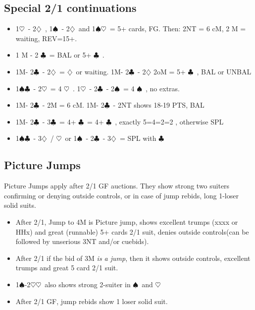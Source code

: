\documentclass{article}
\newcommand\C{\ensuremath{\clubsuit}}
\newcommand\D{\ensuremath{\diamondsuit}}
\renewcommand\H{\ensuremath{\heartsuit}}
\renewcommand\S{\ensuremath{\spadesuit}}
\begin{document}
\begin{multicols}{2}
  \subsection{Special 2/1 continuations}
  \label{2over1}
  \begin{itemize}
    \item 1\H\ - 2\D\ ,  1\S\ - 2\D\ and 1\S{}\H\ = 5+ cards, FG. Then: 2NT = 6 cM, 2 M = waiting, REV=15+.
    \item 1 M - 2 \C\ = BAL or 5+ \C\ .
    \item 1M- 2\C\ - 2\D\ = \D\ or waiting. 1M- 2\C\ - 2\D\- 2oM = 5+ \C\ , BAL or UNBAL
    \item 1\S{}\C\ - 2\H\ = 4 \H\ . 1\H\ - 2\C\ - 2\S\ = 4 \S\ , no extras.
    \item 1M- 2\C\ - 2M = 6 cM. 1M- 2\C\ - 2NT shows 18-19 PTS, BAL
    \item 1M- 2\C\ - 3\C\ = 4+ \C\ = 4+ \C\ , exactly 5=4=2=2 , otherwise SPL
    \item 1\S{}\C\ - 3\D\ / \H\  or 1\S\ - 2\C\ - 3\D\ = SPL with \C\ 
    \end{itemize}
    \subsection{Picture Jumps}
    \label{picture}
    Picture Jumps apply after 2/1 GF auctions. They show strong two suiters confirming or denying outside controls, or  in case of jump rebids, long 1-loser solid suits.
    \begin{itemize}
    \item After 2/1, Jump to 4M is Picture jump, shows excellent trumps (xxxx or HHx) and great (runnable) 5+ cards 2/1 suit, denies outside controls(can be followed by unserious 3NT and/or  cuebids).
    \item After 2/1 if the bid of 3M \emph{is a jump}, then it shows outside controls, excellent trumps and great 5 card 2/1 suit.
    \item 1\S-2\H\-4\H\ also shows strong 2-suiter in \S\ and \H\
    \item After 2/1 GF, jump rebids show 1 loser solid suit. 
  \end{itemize}

\end{multicols}
\end{document}
